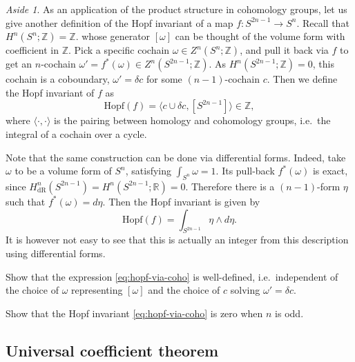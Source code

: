 \documentclass[12pt]{article}
\numberwithin{equation}{section}
\theoremstyle{remark}
\newtheorem{aside}[definition]{Aside}
\def\bR{\mathbb{R}}
\def\bZ{\mathbb{Z}}
\begin{document}
\begin{aside}
As an application of the product structure in cohomology groups,
let us give another definition of the Hopf invariant
of a map $f:S^{2n-1}\to S^n$.
Recall  that $H^n(S^n;\bZ)=\bZ$.
whose generator $[\omega]$ can be thought of the volume form with coefficient in $\bZ$.
Pick a specific cochain $\omega\in Z^n(S^n;\bZ)$,
and pull it back via $f$ to get an $n$-cochain $\omega'= f^*(\omega)\in Z^n(S^{2n-1};\bZ)$.
As $H^n(S^{2n-1};\bZ)=0$, this cochain is a coboundary, $\omega'=\delta c$ for some $(n-1)$-cochain $c$.
Then we define the Hopf invariant of $f$ as \begin{equation}
  \text{Hopf}(f) = \langle c\cup \delta c,[S^{2n-1}]   \rangle \in \bZ,\label{eq:hopf-via-coho}
\end{equation}
where $\langle \cdot,\cdot\rangle$ is the pairing between homology and cohomology groups, i.e.~the integral of a cochain over a cycle.

Note that the same construction can be done via differential forms.
Indeed, take $\omega$ to be a volume form of $S^n$, satisfying $\int_{S^n}\omega=1$.
Its pull-back $f^*(\omega)$ is exact, since $H^n_\text{dR}(S^{2n-1})=H^n(S^{2n-1};\bR)=0$.
Therefore there is a $(n-1)$-form $\eta$ such that $f^*(\omega)=d\eta$.
Then the Hopf invariant is given by \begin{equation}
  \text{Hopf}(f) = \int_{S^{2n-1}} \eta\wedge d\eta.
\end{equation}
It is however not easy to see that this is actually an integer
from this description using differential forms.
\end{aside}

\begin{question}
  Show that the expression \eqref{eq:hopf-via-coho} is well-defined, i.e.~independent of the choice of $\omega$
  representing $[\omega]$ and the choice of $c$ solving $\omega'=\delta c$.
\end{question}
\begin{question}
  Show that the Hopf invariant \eqref{eq:hopf-via-coho} is zero when $n$ is odd.
\end{question}

\subsection{Universal coefficient theorem}
\end{document}
